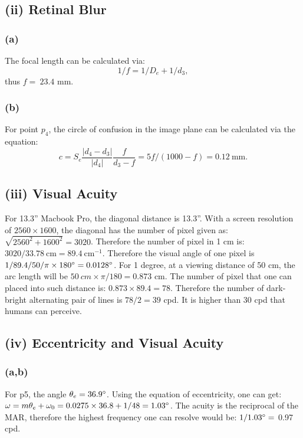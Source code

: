 \documentclass[11pt]{article}
\begin{document}
\subsection*{(ii) Retinal Blur}
\subsubsection*{(a)}
The focal length can be calculated via:
\begin{equation}
    1/f = 1/D_e + 1/d_3,
\end{equation}
thus $f=\ 23.4$ mm. 
\subsubsection*{(b)}
For point $p_4$, the circle of confusion in the image plane can be calculated via the equation:
\begin{equation}
    c = S_e\frac{|d_4-d_3|}{|d_4|}\frac{f}{d_3-f} = 5f/(1000-f) = 0.12\ \text{mm}.
\end{equation}

\subsection*{(iii) Visual Acuity}
For 13.3'' Macbook Pro, the diagonal distance is 13.3''. With a screen resolution of $2560\times1600$, the diagonal has the number of pixel given as: $\sqrt{2560^2+1600^2}=3020$. Therefore the number of pixel in 1 cm is: $3020/33.78\ \text{cm} = 89.4\ \text{cm}^{-1}$. Therefore the visual angle of one pixel is $1/89.4/50/\pi\times180\degree = 0.0128\degree$. For 1 degree, at a viewing distance of 50 cm, the arc length will be $50\ cm \times \pi/180 = 0.873$ cm. The number of pixel that one can placed into such distance is: $0.873\times89.4 = 78$. Therefore the number of dark-bright alternating pair of lines is $78/2=39$ cpd. It is higher than 30 cpd that humans can perceive. 

\subsection*{(iv) Eccentricity and Visual Acuity}
\subsubsection*{(a,b)}
For p5, the angle $\theta_e=36.9\degree$. Using the equation of eccentricity, one can get: $\omega=m\theta_e+\omega_0 = 0.0275\times36.8+1/48 = 1.03\degree $. The acuity is the reciprocal of the MAR, therefore the highest frequency one can resolve would be: $1/1.03\degree=$ 0.97 cpd. 
\end{document}
